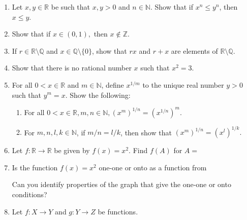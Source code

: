 \begin{enumerate}[label=(\arabic*)]
\item Let $x, y \in \mathbb{R}$ be such that $x, y > 0$ and $n \in \mathbb{N}$. Show that if $x^n\le y^n$, then $x \le y$.
%
\item Show that if $x \in (0, 1),$ then $x \not\in \mathbb{Z}.$
%
\item If $r \in \mathbb{R}\setminus\mathbb{Q}$ and $x\in\mathbb{Q}\setminus\{0\}$, show that $rx$ and $r+x$ are elements of $\mathbb{R}\setminus\mathbb{Q}.$
%
\item Show that there is no rational number $x$ such that $x^2=3.$
%
\item For all $0 < x \in \mathbb{R}$ and $m \in\mathbb{N}$, define $x^{1/m}$ to the unique real number $y > 0$ such that $y^m = x$. Show the following:
\begin{enumerate}[nosep]
    \item For all $0 < x\in\mathbb{R}, m, n \in\mathbb{N}, (x^m)^{1/n}=(x^{1/n})^m.$
    \item For $m, n, l, k \in \mathbb{N}$, if $m/n=l/k$, then show that $(x^m)^{1/n}=(x^l)^{1/k}.$
\end{enumerate}
%
\item Let $f:\mathbb{R}\to\mathbb{R}$ be given by $f(x)=x^2.$ Find $f(A)$ for $A=$\\
\begin{enumerate*}[label=(\roman*)]
	\item $\{1, 1/2, 1/3, -1/2\}$
	\item $[0, 2]$
	\item $(1, 2]$
	\item $[-2, 1)$
	\item $[-2, -1)$
\end{enumerate*}
%
\item Is the function $f(x) = x^2$ one-one or onto as a function from\\
\begin{enumerate*}[label=(\roman*)]
	\item $\mathbb{R}$ to $\mathbb{R}$?
	\item $\mathbb{R}$ to $[0, \infty)$?
	\item $(0, \infty)$ to $(0, \infty)$?
	\item $(0, 1)$ to $(0, 1)$?
\end{enumerate*}
Can you identify properties of the graph that give the one-one or onto conditions?
%
\item Let $f:X\to Y$ and $g:Y\to Z$ be functions.

\end{enumerate}
